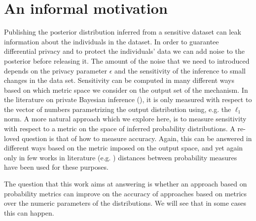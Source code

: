 \documentclass[sigconf]{acmart}
\begin{document}

\maketitle

\section{An informal motivation}
\label{sec_intro}
Publishing the posterior distribution inferred from a sensitive dataset can
leak information about the individuals in the dataset.
In order to guarantee differential privacy and to protect the
individuals' data we can add noise to the posterior before releasing it.
The amount of the noise that we need to  introduced
depends on the privacy parameter $\epsilon$ and the sensitivity of the inference to
small changes in the data set. 
Sensitivity can be computed in many different ways based on which metric space
we consider on the output set of the mechanism. In the literature on private Bayesian
inference (\cite{zhang2016differential,xiao2012bayesian}), it is only measured with
respect to the vector of numbers parametrizing the output distribution using, e.g. the $\ell_1$ norm.
A more natural approach which we explore here, is to measure sensitivity with respect to a metric on the space of inferred probability distributions.
A re-loved question is that of how to measure accuracy. Again,
this can be answered in different ways based on the metric imposed on the output space, and yet again
only in few works in literature (e.g. \cite{zhang2016differential})
distances between probability measures have been used for these purposes.


The question that this work aims at answering is whether
an approach based on probability metrics can improve on the accuracy of approaches based on metrics over
the numeric parameters of the distributions. 
We will see that in some cases this can happen.
\end{document}
